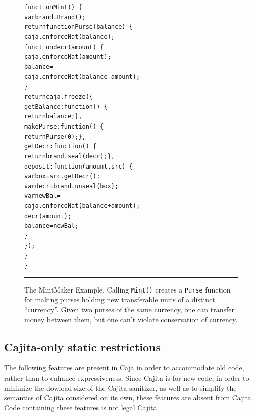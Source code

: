 \documentclass[letterpaper,twocolumn,10pt]{article}
\newcommand{\code}[1]{{\tt {#1}}}              %
\begin{document}
\begin{figure}[t!]
\begin{alltt}
function Mint()\ \{
  var brand = Brand();
  return function Purse(balance)\ \{
    caja.enforceNat(balance);
    function decr(amount)\ \{
      caja.enforceNat(amount);
      balance = 
        caja.enforceNat(balance-amount);
    \}
    return caja.freeze(\{
      getBalance: function()\ \{
        return balance; \},
      makePurse: function()\ \{
        return Purse(0); \},
      getDecr: function()\ \{
        return brand.seal(decr); \},
      deposit: function(amount,src)\ \{
        var box = src.getDecr();
        var decr = brand.unseal(box);
        var newBal = 
          caja.enforceNat(balance+amount);
        decr(amount);
        balance = newBal;
      \}
    \});
  \}
\}
\end{alltt}

\caption[The MintMaker Example]{The MintMaker Example. Calling \code{Mint()} 
creates a \code{Purse} function for making purses holding new transferable 
units of a distinct ``currency''. Given two purses of the same currency, one 
can transfer money between them, but one can't violate conservation of 
currency. \\ } \hrule
\label{fig:mintmaker}
\end{figure}


\subsection{Cajita-only static restrictions}
\label{subsec:cajita-only-static}



The following features are present in Caja in order to accommodate old code, 
rather than to enhance expressiveness. Since Cajita is for new code, in order 
to minimize the dowload size of the Cajita sanitizer, as well as to simplify 
the semantics of Cajita considered on its own, these features are absent from 
Cajita. Code containing these features is not legal Cajita.
\end{document}
